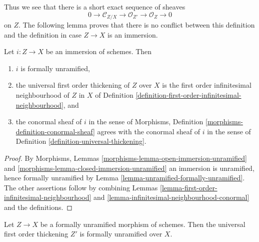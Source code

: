 \noindent
Thus we see that there is a short exact sequence of sheaves
$$
0 \to \mathcal{C}_{Z/X} \to \mathcal{O}_{Z'} \to \mathcal{O}_Z \to 0
$$
on $Z$.
The following lemma proves that there is no conflict between this definition
and the definition in case $Z \to X$ is an immersion.

\begin{lemma}
\label{lemma-immersion-universal-thickening}
Let $i : Z \to X$ be an immersion of schemes. Then
\begin{enumerate}
\item $i$ is formally unramified,
\item the universal first order thickening of $Z$ over $X$ is the first order
infinitesimal neighbourhood of $Z$ in $X$ of
Definition \ref{definition-first-order-infinitesimal-neighbourhood}, and
\item the conormal sheaf of $i$ in the sense of
Morphisms, Definition \ref{morphisms-definition-conormal-sheaf}
agrees with the conormal sheaf of $i$ in the sense of
Definition \ref{definition-universal-thickening}.
\end{enumerate}
\end{lemma}

\begin{proof}
By
Morphisms, Lemmas \ref{morphisms-lemma-open-immersion-unramified} and
\ref{morphisms-lemma-closed-immersion-unramified}
an immersion is unramified, hence formally unramified by
Lemma \ref{lemma-unramified-formally-unramified}.
The other assertions follow by combining
Lemmas \ref{lemma-first-order-infinitesimal-neighbourhood} and
\ref{lemma-infinitesimal-neighbourhood-conormal}
and the definitions.
\end{proof}

\begin{lemma}
\label{lemma-universal-thickening-unramified}
Let $Z \to X$ be a formally unramified morphism of schemes.
Then the universal first order thickening $Z'$ is formally
unramified over $X$.
\end{lemma}

